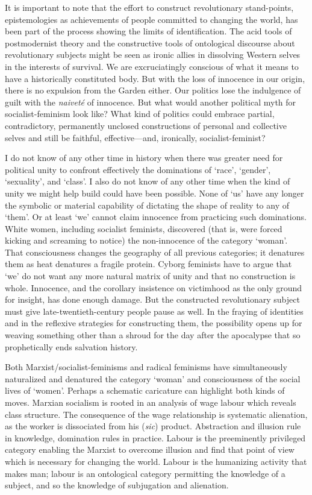 \documentclass[DIV=12,%
               BCOR=10mm,%
               headinclude=false,%
               footinclude=false,open=any,%
               fontsize=11pt,%
               twoside,%
               paper=210mm:11in]%
               {scrbook}
\newcommand*{\Slash}{\slash\hspace{0pt}}
\begin{document}
It is important to note that the effort to construct revolutionary stand-points, epistemologies as achievements of people committed to changing the world, has been part of the process showing the limits of identification. The acid tools of postmodernist theory and the constructive tools of ontological discourse about revolutionary subjects might be seen as ironic allies in dissolving Western selves in the interests of survival. We are excruciatingly conscious of what it means to have a historically constituted body. But with the loss of innocence in our origin, there is no expulsion from the Garden either. Our politics lose the indulgence of guilt with the \emph{naiveté} of innocence. But what would another political myth for socialist-feminism look like? What kind of politics could embrace partial, contradictory, permanently unclosed constructions of personal and collective selves and still be faithful, effective—and, ironically, socialist-feminist?


I do not know of any other time in history when there was greater need for political unity to confront effectively the dominations of ‘race’, ‘gender’, ‘sexuality’, and ‘class’. I also do not know of any other time when the kind of unity we might help build could have been possible. None of ‘us’ have any longer the symbolic or material capability of dictating the shape of reality to any of ‘them’. Or at least ‘we’ cannot claim innocence from practicing such dominations. White women, including socialist feminists, discovered (that is, were forced kicking and screaming to notice) the non-innocence of the category ‘woman’. That consciousness changes the geography of all previous categories; it denatures them as heat denatures a fragile protein. Cyborg feminists have to argue that ‘we’ do not want any more natural matrix of unity and that no construction is whole. Innocence, and the corollary insistence on victimhood as the only ground for insight, has done enough damage. But the constructed revolutionary subject must give late-twentieth-century people pause as well. In the fraying of identities and in the reflexive strategies for constructing them, the possibility opens up for weaving something other than a shroud for the day after the apocalypse that so prophetically ends salvation history.


Both Marxist\Slash{}socialist-feminisms and radical feminisms have simultaneously naturalized and denatured the category ‘woman’ and consciousness of the social lives of ‘women’. Perhaps a schematic caricature can highlight both kinds of moves. Marxian socialism is rooted in an analysis of wage labour which reveals class structure. The consequence of the wage relationship is systematic alienation, as the worker is dissociated from his (\emph{sic}) product. Abstraction and illusion rule in knowledge, domination rules in practice. Labour is the preeminently privileged category enabling the Marxist to overcome illusion and find that point of view which is necessary for changing the world. Labour is the humanizing activity that makes man; labour is an ontological category permitting the knowledge of a subject, and so the knowledge of subjugation and alienation.
\end{document}
